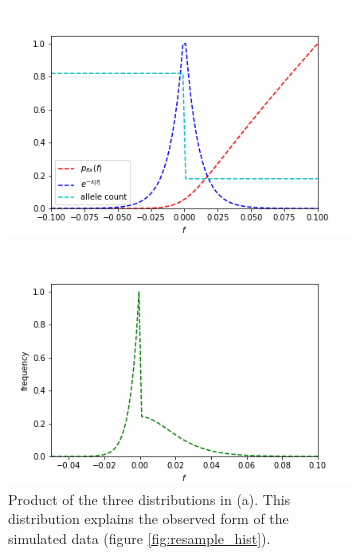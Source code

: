 \documentclass{article}
\begin{document}
\begin{figure}[h]
	\centering
	\begin{subfigure}[t]{0.40\linewidth}
		\centering
		\includegraphics[width = 1.0\linewidth, trim={5 5 40 30}, clip=true]{figures/selection_dists.png}
		\label{fig:alldists}	
	\end{subfigure}
	\hspace{0.1\linewidth}
	\begin{subfigure}[t]{0.40\linewidth}
		\centering
		\includegraphics[width = 1.0\linewidth, trim={5 5 40 30}, clip=true]{figures/all_combined_dists.png}
		\caption{Product of the three distributions in (a). This distribution explains the observed form of the simulated data (figure \ref{fig:resample_hist}).}
		\label{fig:comb}
	\end{subfigure}
\caption{}
\label{fig:theory_resample}
\end{figure}
\end{document}
